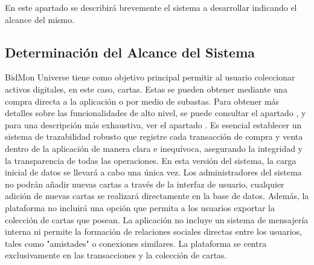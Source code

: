 En este apartado se describirá brevemente el sistema a desarrollar indicando el alcance del mismo.
\subsection{Determinación del Alcance del Sistema}
BidMon Universe tiene como objetivo principal permitir al usuario coleccionar activos digitales, en este caso, cartas. Estas se pueden obtener mediante una compra directa a la aplicación o por medio de subastas. Para obtener más detalles sobre las funcionalidades de alto nivel, se puede consultar el apartado 
, y para una descripción más exhaustiva, ver el apartado .
Es esencial establecer un sistema de trazabilidad robusto que registre cada transacción de compra y venta dentro de la aplicación de manera clara e inequívoca, asegurando la integridad y la transparencia de todas las operaciones.
En esta versión del sistema, la carga inicial de datos se llevará a cabo una única vez. Los administradores del sistema no podrán añadir nuevas cartas a través de la interfaz de usuario, cualquier adición de nuevas cartas se realizará directamente en la base de datos. Además, la plataforma no incluirá una opción que permita a los usuarios exportar la colección de cartas que posean.
La aplicación no incluye un sistema de mensajería interna ni permite la formación de relaciones sociales directas entre los usuarios, tales como "amistades" o conexiones similares. La plataforma se centra exclusivamente en las transacciones y la colección de cartas.



